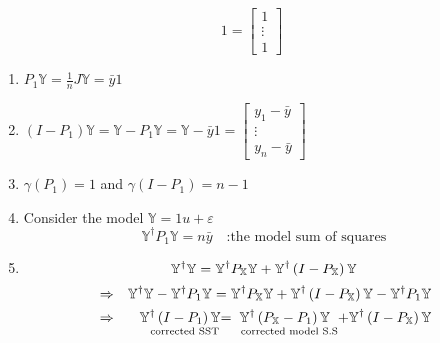 \documentclass{article}
\begin{document}
\begin{equation*}
1=\left[ 
\begin{array}{c}
1 \\ 
\vdots \\ 
1%
\end{array}%
\right]
\end{equation*}

\bigskip

\begin{enumerate}
\item $P_{1}\mathbb{Y}=\frac{1}{n}J\mathbb{Y}=\bar{y}1$

\item $\left( I-P_{1}\right) \mathbb{Y=Y-}P_{1}\mathbb{Y=Y}-\bar{y}1=\left[ 
\begin{array}{c}
y_{1}-\bar{y} \\ 
\vdots \\ 
y_{n}-\bar{y}%
\end{array}%
\right] $

\item $\gamma \left( P_{1}\right) =1$ and $\gamma \left( I-P_{1}\right) =n-1$

\item Consider the model $\mathbb{Y}=1u+\varepsilon $%
\begin{equation*}
\mathbb{Y}^{\dagger }P_{1}\mathbb{Y}=n\bar{y}\quad \text{:the model sum of
squares}
\end{equation*}

\item 
\begin{equation*}
\mathbb{Y}^{\dagger }\mathbb{Y=Y}^{\mathbb{\dagger }}P_{\mathbb{X}}\mathbb{%
Y+Y}^{\mathbb{\dagger }}\left( I-P_{\mathbb{X}}\right) \mathbb{Y}
\end{equation*}%
\begin{eqnarray*}
&\Rightarrow &\mathbb{Y}^{\dagger }\mathbb{Y-\mathbb{Y}^{\mathbb{\dagger }}}%
P_{1}\mathbb{\mathbb{Y}=Y}^{\mathbb{\dagger }}P_{\mathbb{X}}\mathbb{Y+Y}^{%
\mathbb{\dagger }}\left( I-P_{\mathbb{X}}\right) \mathbb{Y-\mathbb{Y}^{%
\mathbb{\dagger }}}P_{1}\mathbb{\mathbb{Y}} \\
&\Rightarrow &\underset{\text{corrected SST}}{\mathbb{Y}^{\mathbb{\dagger }%
}\left( I-P_{1}\right) \mathbb{Y}}\mathbb{=}\underset{\text{corrected model
S.S}}{\mathbb{Y}^{\mathbb{\dagger }}\left( P_{\mathbb{X}}-P_{1}\right) 
\mathbb{Y}}\mathbb{+Y}^{\mathbb{\dagger }}\left( I-P_{\mathbb{X}}\right) 
\mathbb{Y}
\end{eqnarray*}
\end{enumerate}
\end{document}
